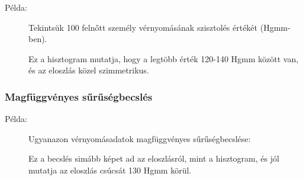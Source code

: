 \documentclass[a4paper,12pt]{article}
\begin{document}
    \begin{description}
        \item[Példa:] Tekintsük 100 felnőtt személy vérnyomásának szisztolés értékét (Hgmm-ben).

        \begin{center}
        \end{center}

        Ez a hisztogram mutatja, hogy a legtöbb érték 120-140 Hgmm között van, és az eloszlás közel szimmetrikus.
    \end{description}

    \subsubsection{Magfüggvényes sűrűségbecslés}

    \begin{description}
        \item[Példa:] Ugyanazon vérnyomásadatok magfüggvényes sűrűségbecslése:

        \begin{center}
        \end{center}

        Ez a becslés simább képet ad az eloszlásról, mint a hisztogram, és jól mutatja az eloszlás csúcsát 130 Hgmm körül.
    \end{description}
\end{document}
